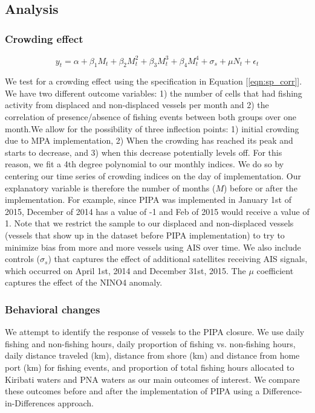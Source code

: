 \documentclass[12pt]{article}
\begin{document}
\clearpage

\subsection{Analysis}

\subsubsection{Crowding effect}

$$
y_t = \alpha + \beta_1 M_t + \beta_2 M_t^2 + \beta_3 M_t^3 + \beta_4 M_t ^4 + \sigma_s + \mu N_t + \epsilon_t
\label{eqn:sp_corr}
$$

We test for a crowding effect using the specification in Equation [\ref{eqn:sp_corr}]. We have two different outcome variables:
1) the number of cells that had fishing activity from displaced and non-displaced vessels per month and 2) the correlation of presence/absence of fishing events between both groups over one month.We allow for the possibility of three inflection points: 1) initial crowding due to MPA implementation, 2) When the crowding has reached its peak and starts to decrease, and 3) when this decrease potentially levels off. For this reason, we fit a 4th degree polynomial to our monthly indices. We do so by centering our time series of crowding indices on the day of implementation. Our explanatory variable is therefore the number of months ($M$) before or after the implementation. For example, since PIPA was implemented in January 1st of 2015, December of 2014 has a value of -1 and Feb of 2015 would receive a value of 1. Note that we restrict the sample to our displaced and non-displaced vessels (vessels that show up in the dataset before PIPA implementation) to try to minimize bias from more and more vessels using AIS over time. We also include controls ($\sigma_s$) that captures the effect of additional satellites receiving AIS signals, which occurred on April 1st, 2014 and December 31st, 2015. The $\mu$ coefficient captures the effect of the NINO4 anomaly.

\subsubsection{Behavioral changes}

We attempt to identify the response of vessels to the PIPA closure. We use daily fishing and non-fishing hours, daily proportion of fishing vs. non-fishing hours, daily distance traveled (km), distance from shore (km) and distance from home port (km) for fishing events, and proportion of total fishing hours allocated to Kiribati waters and PNA waters as our main outcomes of interest. We compare these outcomes before and after the implementation of PIPA using a Difference-in-Differences approach.
\end{document}
